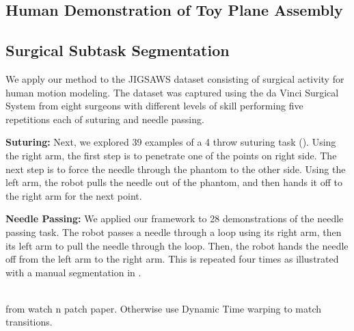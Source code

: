\subsection{Human Demonstration of Toy Plane Assembly}



\subsection{Surgical Subtask Segmentation}

We apply our method to the JIGSAWS dataset\cite{gao2014jigsaws} consisting of surgical activity for human motion modeling. The dataset was captured using the da Vinci Surgical System from eight surgeons with different levels of skill performing five repetitions each of suturing and needle passing.

\vspace{0.5em}
\noindent\textbf{Suturing: }Next, we explored 39 examples of a 4 throw suturing task (). Using the right arm, the first step is to penetrate one of the points on right side. The next step is to force the needle through the phantom to the other side. Using the left arm, the robot pulls the needle out of the phantom, and then hands it off to the right arm for the next point. 


\vspace{0.5em}
\noindent\textbf{Needle Passing: } We applied our framework to 28 demonstrations of the needle passing task.
The robot passes a needle through a loop using its right arm, then its left arm to pull the needle through the loop. Then, the robot hands the needle off from the left arm to the right arm. This is repeated four times as illustrated with a manual segmentation in 
.

\\
 from watch n patch paper. Otherwise use Dynamic Time warping to match transitions.


